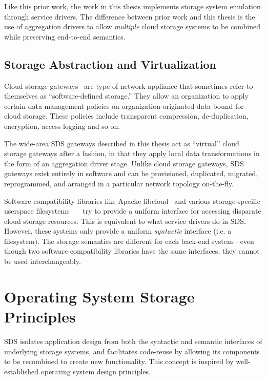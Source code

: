 Like this prior work, the work in this thesis implements storage system emulation
through service drivers.  The difference between prior work and this thesis is
the use of aggregation drivers to allow \emph{multiple} cloud storage systems to
be combined while preserving end-to-end semantics.

\subsection{Storage Abstraction and Virtualization}

Cloud storage gateways~\cite{cloud-storage-gateway} are type of
network appliance that sometimes refer to themselves as ``software-defined storage.''
They allow an organization to apply certain data management
policies on organization-originated data bound for cloud storage.  These
policies include transparent compression, de-duplication, encryption, access
logging and so on.

The wide-area SDS gateways described in this thesis act as ``virtual'' cloud
storage gateways after a fashion, in that they apply local data transformations in the form of
an aggregation driver stage.  Unlike cloud storage gateways, SDS gateways exist
entirely in software and can be provisioned, duplicated, migrated,
reprogrammed, and arranged in a particular network topology on-the-fly.

Software compatibility libraries like Apache libcloud~\cite{libcloud} and various
storage-specific userspace
filesystems~\cite{s3fs}~\cite{dropbox}~\cite{google-drive-fs} try to
provide a uniform interface for accessing disparate cloud storage resources.
This is equivalent to what service drivers do in SDS.  However, these systems only provide a uniform
\emph{syntactic} interface (i.e. a filesystem).  The storage semantics are
different for each back-end system---even though two software compatibility libraries have the same
interfaces, they cannot be used interchangeably.

\section{Operating System Storage Principles}

SDS isolates application design from both the syntactic and semantic interfaces
of underlying storage systems, and facilitates code-reuse by allowing
its components to be recombined to create new functionality.  This concept is
inspired by well-established operating system design principles.

